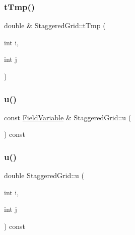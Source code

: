\mbox{\label{classStaggeredGrid_a92970d549989e22eaaa2163c7959043a}} 
\subsubsection{\texorpdfstring{tTmp()}{tTmp()}\hspace{0.1cm}{\footnotesize\ttfamily [2/2]}}
{\footnotesize\ttfamily double \& Staggered\+Grid\+::t\+Tmp (\begin{DoxyParamCaption}\item[{int}]{i,  }\item[{int}]{j }\end{DoxyParamCaption})}

\mbox{\label{classStaggeredGrid_a87cee12621c641ab143a8b1a61b2ef7e}} 
\subsubsection{\texorpdfstring{u()}{u()}\hspace{0.1cm}{\footnotesize\ttfamily [1/3]}}
{\footnotesize\ttfamily const \mbox{\hyperlink{classFieldVariable}{Field\+Variable}} \& Staggered\+Grid\+::u (\begin{DoxyParamCaption}{ }\end{DoxyParamCaption}) const}

\mbox{\label{classStaggeredGrid_a0324ce4d1fe2343d8aa9514e460cc556}} 
\subsubsection{\texorpdfstring{u()}{u()}\hspace{0.1cm}{\footnotesize\ttfamily [2/3]}}
{\footnotesize\ttfamily double Staggered\+Grid\+::u (\begin{DoxyParamCaption}\item[{int}]{i,  }\item[{int}]{j }\end{DoxyParamCaption}) const}

\mbox{\label{classStaggeredGrid_a0ed62d6752b6b2b3ead5f654b515cd12}} 
